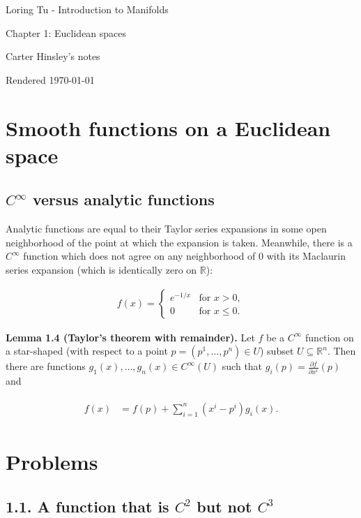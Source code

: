 \documentclass[a4paper]{article}
\newcommand{\R}{\mathbb{R}}
\begin{document}
\begin{center}
\LARGE{Loring Tu - Introduction to Manifolds}

\Large{Chapter 1: Euclidean spaces}

\large{Carter Hinsley's notes}

Rendered \today
\end{center}

\section{Smooth functions on a Euclidean space}

\subsection{$C^\infty$ versus analytic functions}

Analytic functions are equal to their Taylor series expansions in some open neighborhood of the point at which the expansion is taken. Meanwhile, there is a $C^\infty$ function which does not agree on any neighborhood of $0$ with its Maclaurin series expansion (which is identically zero on $\R$):

\begin{align}
    f(x) = \left\{\begin{matrix} e^{-1/x} & \text{for } x > 0, \\ 0 & \text{for } x \leq 0. \end{matrix}\right.
\end{align}

\textbf{Lemma 1.4 (Taylor's theorem with remainder).} Let $f$ be a $C^\infty$ function on a star-shaped (with respect to a point $p = (p^1, \ldots, p^n) \in U$) subset $U \subseteq \R^n$. Then there are functions $g_1(x), \ldots, g_n(x) \in C^\infty(U)$ such that $g_i(p) = \frac{\partial f}{\partial x^i}(p)$ and

\begin{align}
\begin{split}
    f(x) &= f(p) + \sum_{i=1}^n (x^i - p^i)g_i(x).
\end{split}
\end{align}

\section*{Problems}

\subsection*{1.1. A function that is $C^2$ but not $C^3$}
\end{document}
